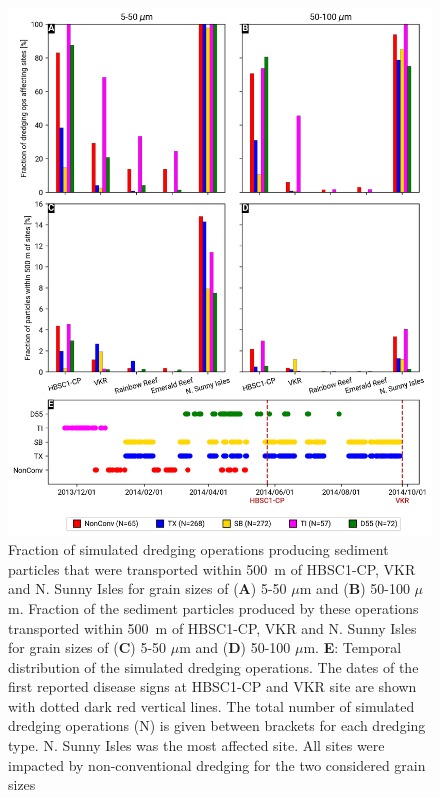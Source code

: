 \documentclass[preprint,12pt,authoryear]{elsarticle}
\begin{document}
\begin{figure}
	\centering
	\includegraphics[width=.85\textwidth]{figures/aggregated_stokes4_v3_500m_timeline_rel.png}
	\caption{Fraction of simulated dredging operations producing sediment particles that were transported within 500~m of HBSC1-CP, VKR and N. Sunny Isles for grain sizes of (\textbf{A}) 5-50 $\mu$m  and (\textbf{B}) 50-100 $\mu$m. Fraction of the sediment particles produced by these operations transported within 500~m of HBSC1-CP, VKR and N. Sunny Isles for grain sizes of (\textbf{C}) 5-50 $\mu$m  and (\textbf{D}) 50-100 $\mu$m. \textbf{E}: Temporal distribution of the simulated dredging operations. The dates of the first reported disease signs at HBSC1-CP and VKR site are shown with dotted dark red vertical lines. The total number of simulated dredging operations (N) is given between brackets for each dredging type. N. Sunny Isles was the most affected site. All sites were impacted by non-conventional dredging for the two considered grain sizes}\label{fig:onset_bar}
\end{figure}
\end{document}
